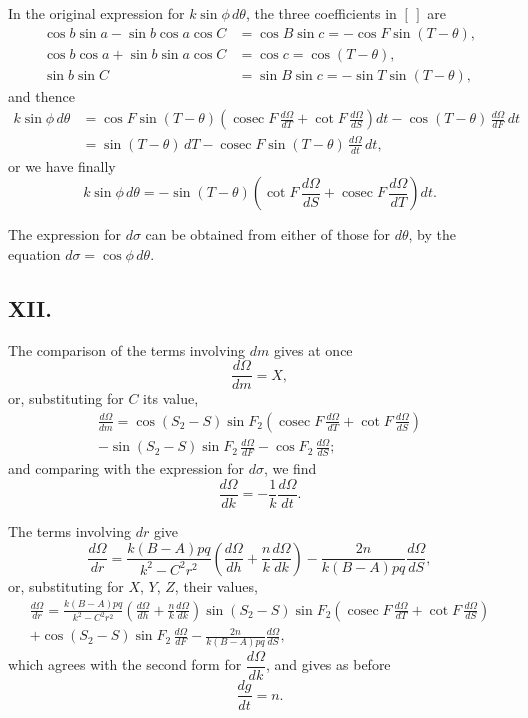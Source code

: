 \documentclass[11pt,a4paper]{article}
\DeclareMathOperator{\cosec}{cosec}
\begin{document}
In the original expression for $k\sin\phi\,d\theta$, the three coefficients in $[\,]$ are
\begin{align*}
\cos b\sin a - \sin b\cos a\cos C &= \cos B\sin c = -\cos F\sin(T-\theta), \\
\cos b\cos a + \sin b\sin a\cos C &= \cos c = \cos(T-\theta), \\
\sin b\sin C &= \sin B\sin c = -\sin T\sin(T-\theta),
\end{align*}
and thence
\begin{align*}
k\sin\phi\,d\theta &= \cos F\sin(T-\theta)\left(\cosec F\,\frac{d\Omega}{dT} + \cot F\,\frac{d\Omega}{dS}\right)dt - \cos(T-\theta)\,\frac{d\Omega}{dF}\,dt \\
&= \sin(T-\theta)\,dT - \cosec F\sin(T-\theta)\,\frac{d\Omega}{dt}\,dt,
\end{align*}
or we have finally
\[
k\sin\phi\,d\theta = -\sin(T-\theta)\left(\cot F\,\frac{d\Omega}{dS} + \cosec F\,\frac{d\Omega}{dT}\right)dt.
\]

The expression for $d\sigma$ can be obtained from either of those for $d\theta$, by the equation $d\sigma = \cos\phi\,d\theta$.

\subsection*{XII.}

The comparison of the terms involving $dm$ gives at once
\[
\frac{d\Omega}{dm} = X,
\]
or, substituting for $C$ its value,
\begin{multline*}
\frac{d\Omega}{dm} = \cos(S_2-S)\sin F_2\left(\cosec F\,\frac{d\Omega}{dT} + \cot F\,\frac{d\Omega}{dS}\right) \\
- \sin(S_2-S)\sin F_2\,\frac{d\Omega}{dF} - \cos F_2\,\frac{d\Omega}{dS};
\end{multline*}
and comparing with the expression for $d\sigma$, we find
\[
\frac{d\Omega}{dk} = -\frac{1}{k}\frac{d\Omega}{dt}.
\]

The terms involving $dr$ give
\[
\frac{d\Omega}{dr} = \frac{k(B-A)pq}{k^2-C^2r^2}\left(\frac{d\Omega}{dh} + \frac{n}{k}\frac{d\Omega}{dk}\right) - \frac{2n}{k(B-A)pq}\frac{d\Omega}{dS},
\]
or, substituting for $X$, $Y$, $Z$, their values,
\begin{multline*}
\frac{d\Omega}{dr} = \frac{k(B-A)pq}{k^2-C^2r^2}\left(\frac{d\Omega}{dh} + \frac{n}{k}\frac{d\Omega}{dk}\right)\sin(S_2-S)\sin F_2\left(\cosec F\,\frac{d\Omega}{dT} + \cot F\,\frac{d\Omega}{dS}\right) \\
+ \cos(S_2-S)\sin F_2\,\frac{d\Omega}{dF} - \frac{2n}{k(B-A)pq}\frac{d\Omega}{dS},
\end{multline*}
which agrees with the second form for $\dfrac{d\Omega}{dk}$, and gives as before
\[
\frac{dg}{dt} = n.
\]
\end{document}
